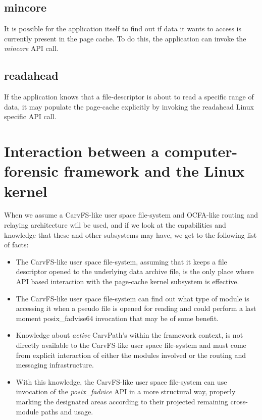 \subsection{mincore}
It is possible for the application itself to find out if data it wants to access is currently present in the page cache. To do this, the application can invoke the \emph{mincore} API call.  
\subsection{readahead}
If the application knows that a file-descriptor is about to read a specific range of data, it may populate the page-cache explicitly by invoking the readahead Linux specific API call.
\section{Interaction between a computer-forensic framework and the Linux kernel}
When we assume a CarvFS-like user space file-system and OCFA-like routing and relaying architecture will be used, and if we look at the capabilities and knowledge that these and other subsystems may have, we get to the following list of facts:
\begin{itemize}
\item The CarvFS-like user space file-system, assuming that it keeps a file descriptor opened to the underlying data archive file, is the only place where API based interaction with the page-cache kernel subsystem is effective.
\item The CarvFS-like user space file-system can find out what type of module is accessing it when a pseudo file is opened for reading and could perform a last moment posix\_fadvise64 invocation that may be of some benefit. 
\item Knowledge about \emph{active} CarvPath's within the framework context, is not directly available to the CarvFS-like user space file-system and must come from explicit interaction of either the modules involved or the routing and messaging infrastructure.
\item With this knowledge, the CarvFS-like user space file-system can use invocation of the \emph{posix\_fadvice} API in a more structural way, properly marking the designated areas according to their projected remaining cross-module paths and usage. 
\end{itemize} 
